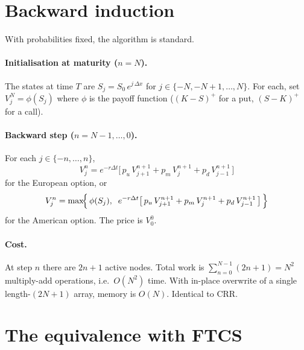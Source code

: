 \documentclass[11pt,a4paper]{article}
\begin{document}
\section{Backward induction}

With probabilities fixed, the algorithm is standard.

\paragraph{Initialisation at maturity ($n = N$).} The states at time
$T$ are $S_j = S_0\,e^{j\,\Delta x}$ for $j \in \{-N, -N+1, \ldots, N\}$.
For each, set $V_j^N = \phi(S_j)$ where $\phi$ is the payoff function
($(K - S)^+$ for a put, $(S - K)^+$ for a call).

\paragraph{Backward step ($n = N-1, \ldots, 0$).} For each
$j \in \{-n, \ldots, n\}$,
\begin{equation}
V_j^n = e^{-r\Delta t}\bigl[\,p_u\,V_{j+1}^{n+1} + p_m\,V_j^{n+1} + p_d\,V_{j-1}^{n+1}\,\bigr]
\label{eq:european-step}
\end{equation}
for the European option, or
\begin{equation}
V_j^n = \max\!\Bigl\{\,\phi(S_j),\;\;
e^{-r\Delta t}\bigl[\,p_u\,V_{j+1}^{n+1} + p_m\,V_j^{n+1} + p_d\,V_{j-1}^{n+1}\,\bigr]\,\Bigr\}
\label{eq:american-step}
\end{equation}
for the American option. The price is $V_0^0$.

\paragraph{Cost.} At step $n$ there are $2n+1$ active nodes. Total
work is $\sum_{n=0}^{N-1}(2n+1) = N^2$ multiply-add operations, i.e.\
$O(N^2)$ time. With in-place overwrite of a single length-$(2N+1)$
array, memory is $O(N)$. Identical to CRR.

\section{The equivalence with FTCS}
\label{sec:equivalence}
\end{document}
